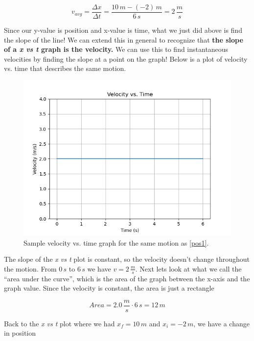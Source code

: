 \documentclass[12pt]{book}
\begin{document}
\begin{equation}
v_{avg} = \frac{\Delta x}{\Delta t} = \frac{10 \, m - (-2) \, m}{6 \, s} = 2 \, \frac{m}{s}
\end{equation}

Since our y-value is position and x-value is time, what we just did above is find the slope of the line! We can extend this in general to recognize that \textbf{the slope of a \textit{x vs t} graph is the velocity.} We can use this to find instantaneous velocities by finding the slope at a point on the graph! Below is a plot of velocity vs. time that describes the same motion.

\begin{figure}[H]
\centering
\includegraphics[scale=0.6]{velocity1.png}
\caption{Sample velocity vs. time graph for the same motion as \ref{pos1}.}
\end{figure}

The slope of the \textit{x vs t} plot is constant, so the velocity doesn't change throughout the motion. From $0 \, s$ to $6 \, s$ we have $v = 2 \, \frac{m}{s}$. Next lets look at what we call the ``area under the curve'', which is the area of the graph between the x-axis and the graph value. Since the velocity is constant, the area is just a rectangle

\begin{equation}
Area = 2.0 \, \frac{m}{s} \cdot 6 \, s = 12 \, m
\end{equation}

Back to the \textit{x vs t} plot where we had $x_f = 10 \, m$ and $x_i = -2 \, m$, we have a change in position
\end{document}
